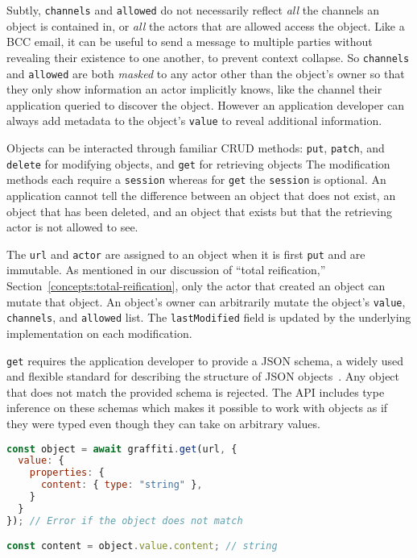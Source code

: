 Subtly, \texttt{channels} and \texttt{allowed} do not necessarily
reflect \emph{all} the channels an object is contained in, or
\emph{all} the actors that are allowed access the object.
Like a BCC email, it can be useful to send a message to multiple parties
without revealing their existence to one another, to prevent
context collapse.
So \texttt{channels} and \texttt{allowed} are both \emph{masked} to any
actor other than the object's owner so that they only show information an actor implicitly knows,
like the channel their application queried to discover the object.
However an application developer can always
add metadata to the object's \texttt{value}
to reveal additional information.

Objects can be interacted through familiar CRUD methods:
\texttt{put}, \texttt{patch}, and \texttt{delete} for modifying objects,
and \texttt{get} for retrieving objects
The modification methods each require a \texttt{session} whereas
for \texttt{get} the \texttt{session} is optional.
An application cannot tell the difference between an object that does not exist,
an object that has been deleted, and an object that exists but that the retrieving actor
is not allowed to see.

The \texttt{url} and \texttt{actor} are assigned to an object when it is first \texttt{put}
and are immutable.
As mentioned in our discussion of ``total reification,'' Section~\ref{concepts:total-reification},
only the actor that created an object can mutate that object.
An object's owner can arbitrarily mutate the object's
\texttt{value}, \texttt{channels}, and \texttt{allowed} list.
The \texttt{lastModified} field is updated by the underlying implementation on each modification.

\texttt{get} requires the application developer to provide
a JSON schema, a widely used and flexible standard for describing
the structure of JSON objects~\cite{jsonschema}.
Any object that does not match the provided schema is rejected.
The API includes type inference on these schemas which makes it possible to work
with objects as if they were typed even though they can take on arbitrary values.

\begin{lstlisting}[language=javascript]
const object = await graffiti.get(url, {
  value: {
    properties: {
      content: { type: "string" },
    }
  }
}); // Error if the object does not match

const content = object.value.content; // string
\end{lstlisting}



